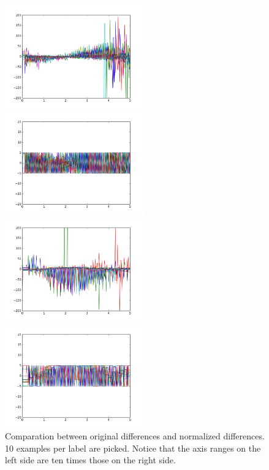 \documentclass[a4paper, 11pt]{article} %
\begin{document}
\begin{figure}[H]
\begin{minipage}{0.5\linewidth}
\end{minipage}
\begin{minipage}{0.5\linewidth}
\centerline{\includegraphics[width=6.0cm]{figure/dif_3.png}}
\end{minipage}
\hfill
\begin{minipage}{0.5\linewidth}
\centerline{\includegraphics[width=6.0cm]{figure/fitdif_3.png}}
\end{minipage}
\vfill
\begin{minipage}{0.5\linewidth}
\centerline{\includegraphics[width=6.0cm]{figure/dif_4.png}}
\end{minipage}
\hfill
\begin{minipage}{0.5\linewidth}
\centerline{\includegraphics[width=6.0cm]{figure/fitdif_4.png}}
\end{minipage}
\caption{Comparation between original differences and normalized differences. 10 examples per label are picked. Notice that the axis ranges on the left side are ten times those on the right side.}
\label{fig_f0fit}
\end{figure}
\end{document}
